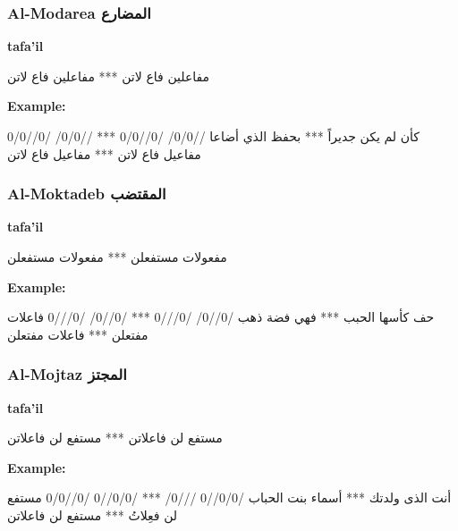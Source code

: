 \subsubsection{Al-Modarea \textarabic{المضارع}}
\textbf{tafa'il}
\begin{Arabic}
\begin{traditionalpoem*}
مفاعلين فاع لاتن *** مفاعلين فاع لاتن
\end{traditionalpoem*}
\end{Arabic}
\textbf{Example:}
\begin{Arabic}
\begin{traditionalpoem*}
كأن لم يكن جديراً *** بحفظ الذي أضاعا
    //0/0/  /0//0/0 *** //0/0/  /0//0/0
    مفاعيل  فاع لاتن *** مفاعيل  فاع لاتن
\end{traditionalpoem*}
\end{Arabic}
\subsubsection{Al-Moktadeb \textarabic{المقتضب}}
\textbf{tafa'il}
\begin{Arabic}
\begin{traditionalpoem*}
مفعولات مستفعلن *** مفعولات مستفعلن
\end{traditionalpoem*}
\end{Arabic}
\textbf{Example:}
\begin{Arabic}
\begin{traditionalpoem*}
حف كأسها الحبب *** فهي فضة ذهب
    /0//0/  /0///0 *** /0//0/  /0///0
    فاعلات  مفتعلن *** فاعلات مفتعلن
\end{traditionalpoem*}
\end{Arabic}
\subsubsection{Al-Mojtaz \textarabic{المجتز}}
\textbf{tafa'il}
\begin{Arabic}
\begin{traditionalpoem*}
مستفع لن فاعلاتن *** مستفع لن فاعلاتن
\end{traditionalpoem*}
\end{Arabic}
\textbf{Example:}
\begin{Arabic}
\begin{traditionalpoem*}
أنت الذى ولدتك *** أسماء بنت الحباب
    /0/0//0  ///0/ *** /0/0//0  /0//0/0
    مستفع لن  فعِلاتُ *** مستفع لن فاعلاتن
\end{traditionalpoem*}
\end{Arabic}
